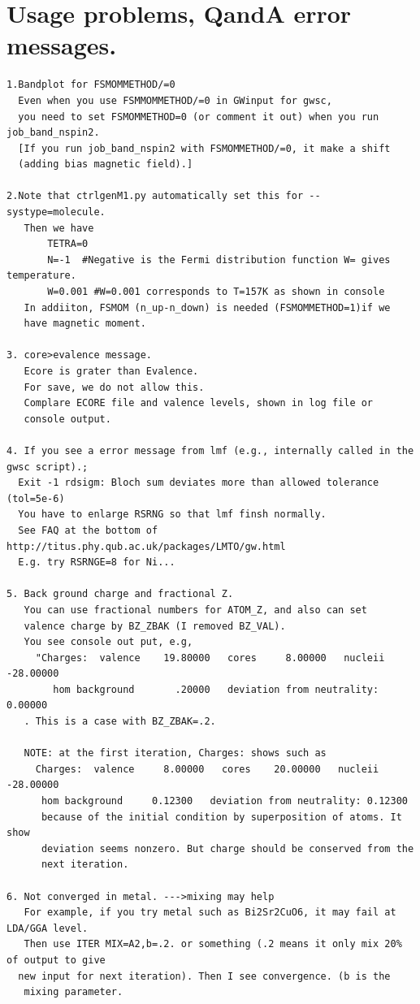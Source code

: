\documentclass[a4paper,10pt,epsf,fleqn]{article}
\begin{document}
{\section{Usage problems, QandA error messages.}
\begin{verbatim}
1.Bandplot for FSMOMMETHOD/=0 
  Even when you use FSMMOMMETHOD/=0 in GWinput for gwsc, 
  you need to set FSMOMMETHOD=0 (or comment it out) when you run job_band_nspin2.
  [If you run job_band_nspin2 with FSMOMMETHOD/=0, it make a shift 
  (adding bias magnetic field).]

2.Note that ctrlgenM1.py automatically set this for --systype=molecule.
   Then we have 
       TETRA=0
       N=-1  #Negative is the Fermi distribution function W= gives temperature.
       W=0.001 #W=0.001 corresponds to T=157K as shown in console
   In addiiton, FSMOM (n_up-n_down) is needed (FSMOMMETHOD=1)if we
   have magnetic moment.

3. core>evalence message.
   Ecore is grater than Evalence.
   For save, we do not allow this.
   Complare ECORE file and valence levels, shown in log file or
   console output.

4. If you see a error message from lmf (e.g., internally called in the gwsc script).;
  Exit -1 rdsigm: Bloch sum deviates more than allowed tolerance (tol=5e-6)
  You have to enlarge RSRNG so that lmf finsh normally.
  See FAQ at the bottom of http://titus.phy.qub.ac.uk/packages/LMTO/gw.html
  E.g. try RSRNGE=8 for Ni...

5. Back ground charge and fractional Z.
   You can use fractional numbers for ATOM_Z, and also can set
   valence charge by BZ_ZBAK (I removed BZ_VAL).
   You see console out put, e.g,
     "Charges:  valence    19.80000   cores     8.00000   nucleii   -28.00000
        hom background       .20000   deviation from neutrality:      0.00000
   . This is a case with BZ_ZBAK=.2.

   NOTE: at the first iteration, Charges: shows such as
     Charges:  valence     8.00000   cores    20.00000   nucleii   -28.00000
      hom background     0.12300   deviation from neutrality: 0.12300
      because of the initial condition by superposition of atoms. It show
      deviation seems nonzero. But charge should be conserved from the
      next iteration.

6. Not converged in metal. --->mixing may help
   For example, if you try metal such as Bi2Sr2CuO6, it may fail at LDA/GGA level.
   Then use ITER MIX=A2,b=.2. or something (.2 means it only mix 20% of output to give
  new input for next iteration). Then I see convergence. (b is the
   mixing parameter.


\end{verbatim}}
\end{document}
